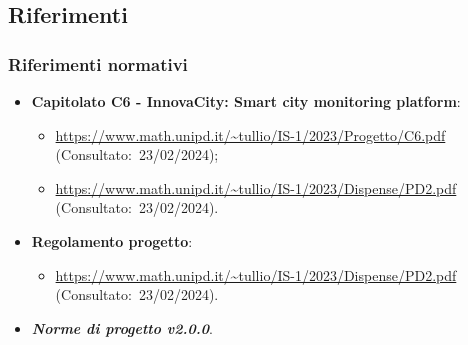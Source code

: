 \subsection{Riferimenti}
\subsubsection{Riferimenti normativi}
\begin{itemize}
    \item \textbf{Capitolato C6 - InnovaCity: Smart city monitoring platform}:
    \begin{itemize}
        \item \url{https://www.math.unipd.it/~tullio/IS-1/2023/Progetto/C6.pdf} (Consultato:~23/02/2024);
        \item \url{https://www.math.unipd.it/~tullio/IS-1/2023/Dispense/PD2.pdf} (Consultato:~23/02/2024).
    \end{itemize}
    \item \textbf{Regolamento progetto}:
    \begin{itemize}
        \item \url{https://www.math.unipd.it/~tullio/IS-1/2023/Dispense/PD2.pdf} (Consultato:~23/02/2024).
    \end{itemize}
    \item \textbf{\textit{Norme di progetto v2.0.0}}.
    
\end{itemize}
